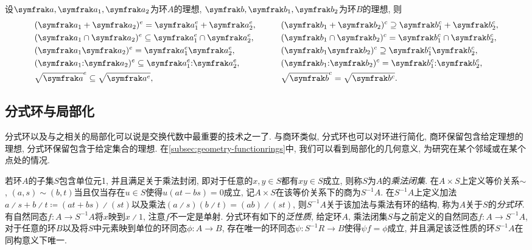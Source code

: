 \begin{proposition}\label{prop:extencontrop}
  设$\ideal{a}, \ideal{a}_1, \ideal{a}_2$为环$A$的理想, $\ideal{b}, \ideal{b}_1, \ideal{b}_2$为环$B$的理想, 则
  \begin{equation*}
    \begin{aligned}
      &(\ideal{a}_1+\ideal{a}_2)^e=\ideal{a}_1^e+\ideal{a}_2^e,
      &&\qquad(\ideal{b}_1+\ideal{b_2})^c\supseteq \ideal{b}_1^c+\ideal{b}_2^c,\\
      &(\ideal{a}_1\cap\ideal{a}_2)^e\subseteq\ideal{a}_1^e\cap\ideal{a}_2^e,
      &&\qquad(\ideal{b}_1\cap\ideal{b_2})^c= \ideal{b}_1^c\cap\ideal{b}_2^c,\\
      &(\ideal{a}_1\ideal{a}_2)^e=\ideal{a}_1^e\ideal{a}_2^e,
      &&\qquad(\ideal{b}_1\ideal{b_2})^c\supseteq\ideal{b}_1^c\ideal{b}_2^c,\\
      &(\ideal{a}_1{:}\ideal{a}_2)^e\subseteq\ideal{a}_1^e{:}\ideal{a}_2^e,
      &&\qquad(\ideal{b}_1{:}\ideal{b_2})^c= \ideal{b}_1^c{:}\ideal{b}_2^c,\\
      &\sqrt{\ideal{a}}^e\subseteq\sqrt{\ideal{a}^e},
      &&\qquad\sqrt{\ideal{b}}^c= \sqrt{\ideal{b}^c}.
    \end{aligned}
  \end{equation*}
\end{proposition}

\subsection{分式环与局部化}\label{subsec:algebra-localization}

分式环以及与之相关的局部化可以说是交换代数中最重要的技术之一了. 与商环类似, 分式环也可以对环进行简化, 商环保留包含给定理想的理想, 分式环保留包含于给定集合的理想. 在\ref{subsec:geometry-functionrings}中, 我们可以看到局部化的几何意义, 为研究在某个邻域或在某个点处的情况.

若环$A$的子集$S$包含单位元1, 并且满足关于乘法封闭, 即对于任意的$x, y\in S$都有$xy\in S$成立, 则称$S$为$A$的\emph{乘法闭集}. 在$A\times S$上定义等价关系${\sim}$, $(a, s)\sim (b, t)$当且仅当存在$u\in S$使得$u(at-bs)=0$成立, 记$A\times S$在该等价关系下的商为$S^{-1}A$. 在$S^{-1}A$上定义加法$a{\divslash} s+b{\divslash}t \coloneq  (at+bs){\divslash}(st)$以及乘法$(a{\divslash}s)(b{\divslash}t)=(ab){\divslash}(st)$, 则$S^{-1}A$关于该加法与乘法有环的结构, 称为$A$关于$S$的\emph{分式环}. 有自然同态$f\colon A\to S^{-1}A$将$x$映到$x{\divslash}1$, 注意$f$不一定是单射. 分式环有如下的\emph{泛性质}\parencites[81, Theorem 11.3]{altman_term_2017}[37, Proposition 3.1]{atiyah_introduction_1969}, 给定环$A$, 乘法闭集$S$与之前定义的自然同态$f\colon A\to S^{-1}A$, 对于任意的环$B$以及将$S$中元素映到单位的环同态$\phi\colon A\to B$, 存在唯一的环同态$\psi\colon S^{-1}R\to B$使得$\psi f=\phi$成立, 并且满足该泛性质的环$S^{-1}A$在同构意义下唯一.


